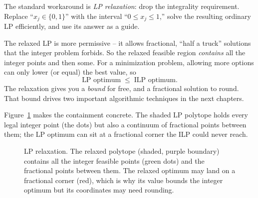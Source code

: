 The standard workaround is \emph{LP relaxation}: drop the integrality requirement.
Replace ``$x_j \in \{0,1\}$'' with the interval ``$0 \le x_j \le 1$,'' solve
the resulting ordinary LP efficiently, and use its answer as a guide.

\begin{intuitionbox}
The relaxed LP is more permissive -- it allows fractional, ``half a truck''
solutions that the integer problem forbids. So the relaxed feasible region
\emph{contains} all the integer points and then some. For a minimization
problem, allowing more options can only lower (or equal) the best value, so
\[
\text{LP optimum} \;\le\; \text{ILP optimum}.
\]
The relaxation gives you a \emph{bound} for free, and a fractional solution to
round. That bound drives two important algorithmic
techniques in the next chapters.
\end{intuitionbox}

Figure~\ref{ch28:fig-relax} makes the containment concrete. The shaded LP
polytope holds every legal integer point (the dots) but also a continuum of
fractional points between them; the LP optimum can sit at a fractional corner
the ILP could never reach.

\begin{figure}[H]
\centering
{}
\caption{LP relaxation. The relaxed polytope (shaded, purple boundary) contains
all the integer feasible points (green dots) and the fractional points between
them. The relaxed optimum may land on a fractional corner (red), which is why
its value bounds the integer optimum but its coordinates may need rounding.}
\label{ch28:fig-relax}
\end{figure}

